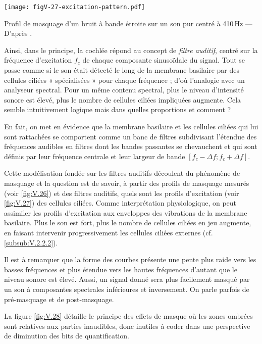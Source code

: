 \begin{marginfigure}
\texttt{[image: figV-27-excitation-pattern.pdf]}
\caption{\label{fig:V.27}Profil de masquage d'un bruit à bande étroite sur un son pur centré à 410\,Hz --- D'après \parencite{Rossing-etal:2002}.}
\end{marginfigure}

Ainsi, dans le principe, la cochlée répond au concept de \emph{filtre auditif}, centré sur la fréquence d'excitation $f_c$ de chaque composante sinusoïdale du signal. Tout se passe comme si le son était détecté le long de la membrane basilaire par des cellules ciliées « spécialisées » pour chaque fréquence ; d'où l'analogie avec un analyseur spectral. Pour un même contenu spectral, plus le niveau d'intensité sonore est élevé, plus le nombre de cellules ciliées impliquées augmente. Cela semble intuitivement logique mais dans quelles proportions et comment ?

En fait, on met en évidence que la membrane basilaire et les cellules ciliées qui lui sont rattachées se comportent comme un banc de filtres subdivisant l'étendue des fréquences audibles en filtres dont les bandes passantes se chevauchent et qui sont définis par leur fréquence centrale et leur largeur de bande $[f_c - \Delta f ; f_c + \Delta f]$.

Cette modélisation fondée sur les filtres auditifs découlent du phénomène de masquage et la question est de savoir, à partir des profils de masquage mesurés (voir \cref{fig:V.26}) et des filtres auditifs, quels sont les profils d'excitation (voir \cref{fig:V.27}) des cellules ciliées. Comme interprétation physiologique, on peut assimiler les profils d'excitation aux enveloppes des vibrations de la membrane basilaire. Plus le son est fort, plus le nombre de cellules ciliées en jeu augmente, en faisant intervenir progressivement les cellules ciliées externes (cf. \cref{subsub:V.2.2.2}).

Il est à remarquer que la forme des courbes présente une pente plus raide vers les basses fréquences et plus étendue vers les hautes fréquences d'autant que le niveau sonore est élevé. Aussi, un signal donné sera plus facilement masqué par un son à composantes spectrales inférieures et inversement. On parle parfois de pré-masquage et de post-masquage.

La figure \cref{fig:V.28} détaille le principe des effets de masque où les zones ombrées sont relatives aux parties inaudibles, donc inutiles à coder dans une perspective de diminution des bits de quantification.

